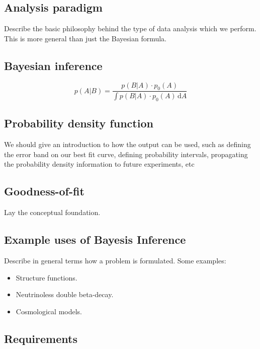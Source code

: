 \documentclass[11pt, a4paper]{article}
\begin{document}
\subsection{Analysis paradigm} 

Describe the basic philosophy behind the type of data analysis which
we perform. This is more general than just the Bayesian formula. 

\subsection{Bayesian inference} 

\begin{equation}
p(A|B) = \frac{p(B|A) \cdot p_{0}(A)}{\int p(B|A) \cdot p_{0}(A) \, \mathrm{d}A }
\label{eqn:BayesTheorem}
\end{equation}

\subsection{Probability density function} 

We should give an introduction to how the output can be used, such as
defining the error band on our best fit curve, defining probability
intervals, propagating the probability density information to future
experiments, etc

\subsection{Goodness-of-fit} 

Lay the conceptual foundation. 

\subsection{Example uses of Bayesis Inference} 
\label{subsection:exampleuses} 

Describe in general terms how a problem is formulated. Some examples:

\begin{itemize}
\item Structure functions. 
%
\item Neutrinoless double beta-decay. 
% 
\item Cosmological models.  
\end{itemize}

\subsection{Requirements} 
\end{document}
